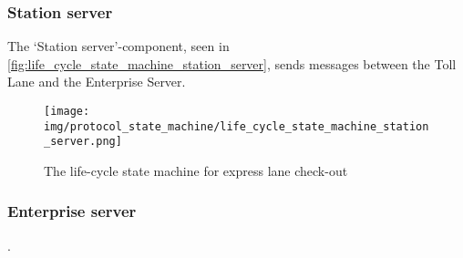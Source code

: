 \subsubsection*{Station server}
The ‘Station server’-component, seen in \autoref{fig:life_cycle_state_machine_station_server}, sends messages between the Toll Lane and the Enterprise Server.
\begin{figure}
\centering
\texttt{[image: img/protocol\_state\_machine/life\_cycle\_state\_machine\_station\_server.png]}
\caption{The life-cycle state machine for express lane check-out}
\label{fig:life_cycle_state_machine_station_server}
\end{figure}


\subsubsection*{Enterprise server}
.